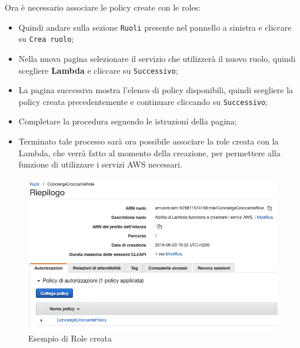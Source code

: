Ora è necessario associare le policy create con le roles:
\begin{itemize}
	\item Quindi andare sulla sezione \texttt{Ruoli} presente nel pannello a sinistra e cliccare su \texttt{Crea ruolo};
	\item Nella nuova pagina selezionare il servizio che utilizzerà il nuovo ruolo, quindi scegliere \textbf{Lambda} e cliccare su \texttt{Successivo};
	\item La pagina successiva mostra l'elenco di policy disponibili, quindi scegliere la policy creata precedentemente e continuare cliccando su \texttt{Successivo};
	\item Completare la procedura seguendo le istruzioni della pagina;
	\item Terminato tale processo sarà ora possibile associare la role creata con la Lambda, che verrà fatto al momento della creazione, per permettere alla funzione di utilizzare i servizi AWS necessari.
\end{itemize}
\begin{figure}[H] 
    \centering 
    \includegraphics[width=1\columnwidth]{immagini/amazon-iam-role.png}
    \caption{\label{fig:esempio-amazon-iam-role}Esempio di Role creata}
\end{figure}

\newpage
